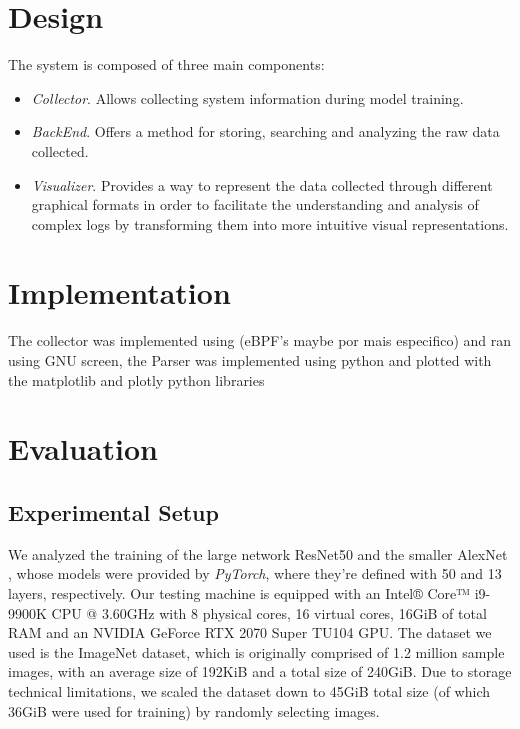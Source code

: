 \documentclass[conference]{IEEEtran}
\begin{document}
\section{Design}
The system is composed of three main components:
\begin{itemize}
	\item \textit{Collector}. Allows collecting system information during model training.
	\item \textit{BackEnd}. Offers a method for storing, searching and analyzing the raw data collected.
	\item \textit{Visualizer}. Provides a way to represent the data collected through different graphical formats in order to facilitate the understanding and analysis of complex logs by transforming them into more intuitive visual representations.
\end{itemize}

\section{Implementation}
The collector was implemented using (eBPF's maybe por mais especifico) and ran using GNU screen, the Parser was implemented using python and plotted with the matplotlib and plotly python libraries

\section{Evaluation}

\subsection{Experimental Setup}

We analyzed the training of the large network ResNet50 \cite{resnet50} and the smaller AlexNet \cite{alexnet}, whose models were
provided by \textit{PyTorch}, where they're defined with 50 and 13 layers, respectively. Our testing machine is equipped with an Intel® Core™ i9-9900K CPU @ 3.60GHz with
8 physical cores, 16 virtual cores, 16GiB of total RAM and an NVIDIA GeForce RTX 2070 Super TU104 GPU. The dataset we used is the ImageNet \cite{imagenet} dataset, which is originally comprised of 1.2 million sample images, with an average size of 192KiB and a total size of 240GiB. Due to storage technical limitations, we scaled the dataset down to 45GiB total size (of which 36GiB were used for training) by randomly selecting images.
\end{document}
